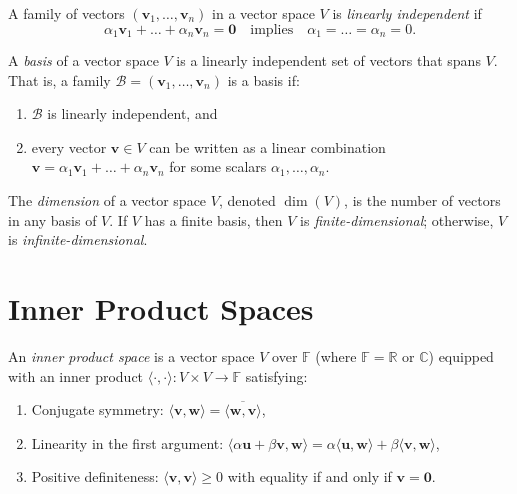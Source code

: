 \begin{definition}
  A family of vectors $(\mathbf{v}_1,\dots,\mathbf{v}_n)$ in a vector space $V$ is
  \emph{linearly independent} if
  \begin{equation}
    \alpha_1\mathbf{v}_1 + \dots + \alpha_n\mathbf{v}_n = \mathbf{0}
    \quad \text{implies} \quad
    \alpha_1 = \dots = \alpha_n = 0.
  \end{equation}
\end{definition}

\begin{definition}[Basis]
  A \emph{basis} of a vector space $V$ is a linearly independent set of vectors that spans $V$.
  That is, a family $\mathcal{B} = (\mathbf{v}_1,\dots,\mathbf{v}_n)$ is a basis if:
  \begin{enumerate}
    \item $\mathcal{B}$ is linearly independent, and
    \item every vector $\mathbf{v} \in V$ can be written as a linear combination
          $\mathbf{v} = \alpha_1\mathbf{v}_1 + \dots + \alpha_n\mathbf{v}_n$ for some scalars $\alpha_1,\dots,\alpha_n$.
  \end{enumerate}
\end{definition}

\begin{definition}[Dimension]
  The \emph{dimension} of a vector space $V$, denoted $\dim(V)$, is the number of vectors in any basis of $V$.
  If $V$ has a finite basis, then $V$ is \emph{finite-dimensional}; otherwise, $V$ is \emph{infinite-dimensional}.
\end{definition}

\section{Inner Product Spaces}

\begin{definition}
  An \emph{inner product space} is a vector space $V$ over $\mathbb{F}$ (where $\mathbb{F} = \mathbb{R}$ or $\mathbb{C}$)
  equipped with an inner product $\langle \cdot, \cdot \rangle : V \times V \to \mathbb{F}$ satisfying:
  \begin{enumerate}
    \item Conjugate symmetry: $\langle \mathbf{v}, \mathbf{w} \rangle = \overline{\langle \mathbf{w}, \mathbf{v} \rangle}$,
    \item Linearity in the first argument: $\langle \alpha\mathbf{u} + \beta\mathbf{v}, \mathbf{w} \rangle = \alpha\langle \mathbf{u}, \mathbf{w} \rangle + \beta\langle \mathbf{v}, \mathbf{w} \rangle$,
    \item Positive definiteness: $\langle \mathbf{v}, \mathbf{v} \rangle \geq 0$ with equality if and only if $\mathbf{v} = \mathbf{0}$.
  \end{enumerate}
\end{definition}

